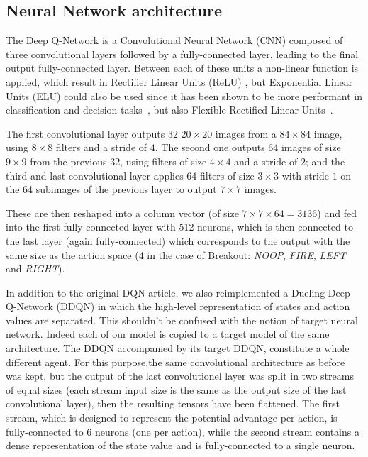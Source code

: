\documentclass[letterpaper]{article}
\begin{document}
\subsection{Neural Network architecture}

The Deep Q-Network is a Convolutional Neural Network (CNN) composed of three convolutional layers followed by a fully-connected layer,
leading to the final output fully-connected layer.
Between each of these units a non-linear function is applied, which result in Rectifier Linear Units (ReLU) \citep{krizhevsky2012imagenet}, but Exponential Linear Units (ELU) could
also be used since it has been shown to be more performant in classification and decision tasks~\citep{DBLP:journals/corr/ClevertUH15}, but also
Flexible Rectified Linear Units~\citep{qiu2017flexible}.

The first convolutional layer outputs 32 $20 \times 20$ images from a $84 \times 84$ image, using $8 \times 8$ filters and a stride of $4$. The second one outputs
64 images of size $9 \times 9$ from the previous 32, using filters of size $4 \times 4$ and a stride of $2$; and the third and last convolutional layer
applies 64 filters of size $3 \times 3$ with stride $1$ on the 64 subimages of the previous layer to output $7 \times 7$ images.

These are then reshaped into a column vector (of size $7 \times 7 \times 64 = 3136$) and fed into the first fully-connected layer with 512 neurons,
which is then connected to the last layer (again fully-connected) which corresponds to the output with the same size as the action space (4 in the
case of Breakout: \textit{NOOP}, \textit{FIRE}, \textit{LEFT} and \textit{RIGHT}).

In addition to the original DQN article, we also reimplemented a Dueling Deep Q-Network \citep{DBLP} (DDQN) in which the high-level representation of states 
and action values are separated. This shouldn't be confused with the notion of target neural network. Indeed each of our model is copied to a target model
of the same architecture. The DDQN accompanied by its target DDQN, constitute a whole different agent.
For this purpose,the same convolutional architecture as before was kept, but the output of the last convolutionel layer was split in two streams of
equal sizes (each stream input size is the same as the output size of the last convolutional layer), then the resulting tensors have been flattened.
The first stream, which is designed to represent the potential advantage per action, is fully-connected to 6 neurons (one per action), while the second stream
contains a dense representation of the state value and is fully-connected to a single neuron.
\end{document}
